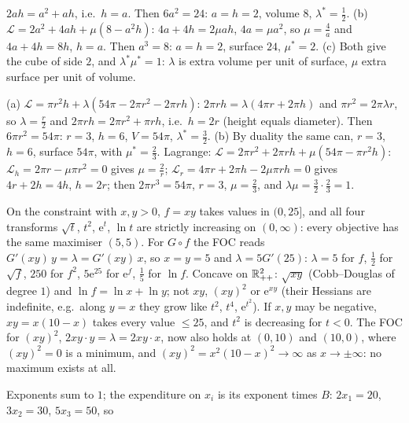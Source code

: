 \begin{solutions}
        $2ah=a^{2}+ah$, i.e.\ $h=a$. Then $6a^{2}=24$: $a=h=2$, volume $8$,
        $\lambda^*=\tfrac12$.
        (b) $\mathcal{L}=2a^{2}+4ah+\mu(8-a^{2}h)$: $4a+4h=2\mu ah$,
        $4a=\mu a^{2}$, so $\mu=\tfrac4a$ and $4a+4h=8h$, $h=a$. Then
        $a^{3}=8$: $a=h=2$, surface $24$, $\mu^*=2$.
        (c) Both give the cube of side $2$, and $\lambda^*\mu^*=1$: $\lambda$
        is extra volume per unit of surface, $\mu$ extra surface per unit of
        volume.
  \item (a) $\mathcal{L}=\pi r^{2}h+\lambda(54\pi-2\pi r^{2}-2\pi rh)$:
        $2\pi rh=\lambda(4\pi r+2\pi h)$ and $\pi r^{2}=2\pi\lambda r$, so
        $\lambda=\tfrac r2$ and $2\pi rh=2\pi r^{2}+\pi rh$, i.e.\ $h=2r$
        (height equals diameter). Then $6\pi r^{2}=54\pi$: $r=3$, $h=6$,
        $V=54\pi$, $\lambda^*=\tfrac32$.
        (b) By duality the same can, $r=3$, $h=6$, surface $54\pi$, with
        $\mu^*=\tfrac23$. Lagrange:
        $\mathcal{L}=2\pi r^{2}+2\pi rh+\mu(54\pi-\pi r^{2}h)$:
        $\mathcal{L}_h=2\pi r-\mu\pi r^{2}=0$ gives $\mu=\tfrac2r$;
        $\mathcal{L}_r=4\pi r+2\pi h-2\mu\pi rh=0$ gives $4r+2h=4h$, $h=2r$;
        then $2\pi r^{3}=54\pi$, $r=3$, $\mu=\tfrac23$, and
        $\lambda\mu=\tfrac32\cdot\tfrac23=1$.
  \item On the constraint with $x,y>0$, $f=xy$ takes values in $(0,25]$,
        and all four transforms $\sqrt t$, $t^{2}$, $\mathrm{e}^{t}$,
        $\ln t$ are strictly increasing on $(0,\infty)$: every objective has
        the same maximiser $(5,5)$. For $G\circ f$ the FOC reads
        $G'(xy)\,y=\lambda=G'(xy)\,x$, so $x=y=5$ and
        $\lambda=5G'(25)$: $\lambda=5$ for $f$, $\tfrac12$ for $\sqrt f$,
        $250$ for $f^{2}$, $5\mathrm{e}^{25}$ for $\mathrm{e}^{f}$, $\tfrac15$
        for $\ln f$. Concave on $\mathbb{R}^{2}_{++}$: $\sqrt{xy}$ (Cobb--Douglas of
        degree $1$) and $\ln f=\ln x+\ln y$; not $xy$, $(xy)^{2}$ or
        $\mathrm{e}^{xy}$ (their Hessians are indefinite, e.g.\ along $y=x$
        they grow like $t^{2}$, $t^{4}$, $\mathrm{e}^{t^{2}}$). If $x,y$ may
        be negative, $xy=x(10-x)$ takes every value $\le25$, and $t^{2}$ is
        decreasing for $t<0$. The FOC for $(xy)^{2}$, $2xy\cdot y=\lambda
        =2xy\cdot x$, now also holds at $(0,10)$ and $(10,0)$, where
        $(xy)^{2}=0$ is a minimum, and $(xy)^{2}=x^{2}(10-x)^{2}\to\infty$ as
        $x\to\pm\infty$: no maximum exists at all.
  \item Exponents sum to $1$; the expenditure on $x_i$ is its exponent
        times $B$: $2x_1=20$, $3x_2=30$, $5x_3=50$, so

\end{solutions}
